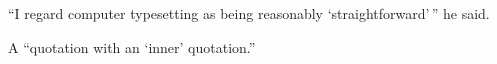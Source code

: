 \documentclass[12pt]{article}
\begin{document}
 
``I regard computer typesetting as being reasonably
`straightforward'\,'' he said.

A \enquote{quotation with an \enquote{inner} quotation.}
\end{document}
